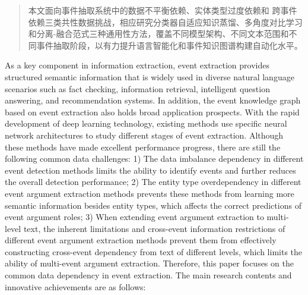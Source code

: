 \begin{abstract}
本文面向事件抽取系统中的数据不平衡依赖、实体类型过度依赖和
跨事件依赖三类共性数据挑战，相应研究分类器自适应知识蒸馏、多角度对比学习和分离-融合范式三种通用性方法，覆盖不同模型架构、不同文本范围和不同事件抽取阶段，以有力提升语言智能化和事件知识图谱构建自动化水平。

\end{abstract}

\begin{englishabstract}

As a key component in information extraction, event extraction provides structured semantic information that is widely used in diverse natural language scenarios such as fact checking, information retrieval, intelligent question answering, and recommendation systems. In addition, the event knowledge graph based on event extraction also holds broad application prospects. With the rapid development of deep learning technology, existing methods use specific neural network architectures to study different stages of event extraction. Although these methods have made excellent performance progress, there are still the following common data challenges: 1) The data imbalance dependency in different event detection methods limits the ability to identify events and further reduces the overall detection performance; 2) The entity type overdependency in different event argument extraction methods prevents these methods from learning more semantic information besides entity types, which affects the correct predictions of event argument roles; 3) When extending event argument extraction to multi-level text, the inherent limitations and cross-event information restrictions of different event argument extraction methods prevent them from effectively constructing cross-event dependency from text of different levels, which limits the ability of multi-event argument extraction. Therefore, this paper focuses on the common data dependency in event extraction. The main research contents and innovative achievements are as follows:


\end{englishabstract}
